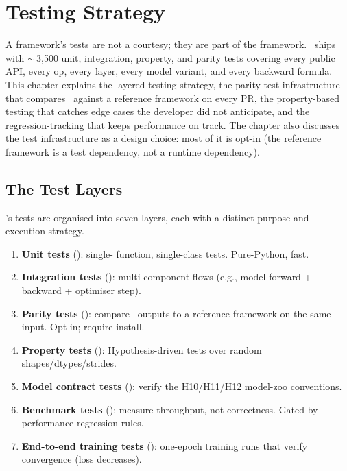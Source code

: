 \chapter{Testing Strategy}
\label{ch:testing}

A framework's tests are not a courtesy; they are part of the
framework. \Lucid\ ships with $\sim$\,3,500 unit, integration,
property, and parity tests covering every public API, every
op, every layer, every model variant, and every backward
formula. This chapter explains the layered testing strategy,
the parity-test infrastructure that compares \Lucid\ against
a reference framework on every PR, the property-based testing
that catches edge cases the developer did not anticipate,
and the regression-tracking that keeps performance on track.
The chapter also discusses the test infrastructure as a design
choice: most of it is opt-in (the reference framework is a test
dependency, not a runtime dependency).

\section{The Test Layers}
\label{sec:testing:layers}

\Lucid's tests are organised into seven layers, each with a
distinct purpose and execution strategy.

\begin{enumerate}
  \item \textbf{Unit tests} (): single-
    function, single-class tests. Pure-Python, fast.
  \item \textbf{Integration tests}
    (): multi-component flows
    (e.g., model forward + backward + optimiser step).
  \item \textbf{Parity tests} ():
    compare \Lucid\ outputs to a reference framework on the
    same input. Opt-in; require  install.
  \item \textbf{Property tests} ():
    Hypothesis-driven \cite{hypothesis_maciver} tests over
    random shapes/dtypes/strides.
  \item \textbf{Model contract tests}
    ():
    verify the H10/H11/H12 model-zoo conventions.
  \item \textbf{Benchmark tests} ():
    measure throughput, not correctness. Gated by performance
    regression rules.
  \item \textbf{End-to-end training tests}
    (): one-epoch training runs that
    verify convergence (loss decreases).
\end{enumerate}

